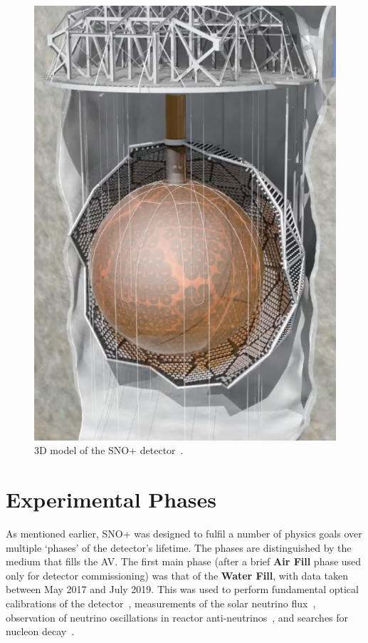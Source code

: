 \begin{figure}
    \centering
    \includegraphics[width=0.48\linewidth]{2_Detector/Figs/detector_picture.png}
    \caption[3D model of the SNO+ detector]{3D model of the SNO+ detector~\cite{albaneseSNOExperiment2021}.}
    \label{fig:snoplus_detector}
\end{figure}

\section{Experimental Phases}\label{sec:exp_phases}
As mentioned earlier, SNO+ was designed to fulfil a number of physics goals over multiple `phases' of the detector's lifetime. The phases are distinguished by the medium that fills the AV. The first main phase (after a brief \textbf{Air Fill} phase used only for detector commissioning) was that of the \textbf{Water Fill}, with data taken between May 2017 and July 2019. This was used to perform fundamental optical calibrations of the detector~\cite{andersonOpticalCalibrationSNO2021}, %
measurements of the solar neutrino flux~\cite{}, %
observation of neutrino oscillations in reactor anti-neutrinos~\cite{}, %
and searches for nucleon decay~\cite{}. %

